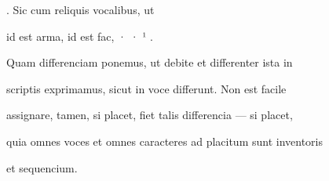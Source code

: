  . Sic cum reliquis vocalibus, ut   

 id est arma,  id est fac, · · ¹ . 

Quam differenciam ponemus, ut debite et differenter ista in 

scriptis exprimamus, sicut in voce differunt. Non est facile 

assignare, tamen, si placet, fiet talis differencia — si placet,




\fullpreviouslines

{
\color{blue}
quia omnes voces et omnes caracteres ad placitum sunt inventoris

et sequencium.

}


\endinput






Non est facile 

assignare, tamen, si placet, fiet talis differencia — si placet,

60:
eo \y rkp.: quantocius.


\catcode `\^^M=5

  \newtip{48}{Łoś niesłusznie uważa, że \textit{bika} w obu wypadkach
    napisano błędnie zamiast \textit{ƀyka}. Przykłady są bowiem podane
    w~pisowni dotychczasowej dla pokazania jej niewystarczalności do
    zróżnicowania wyrazów \textit{bika} i \textit{byka}.} 

\obeylines




\newcommand{\margin}[1]{\annotatetextBlue{\{#1\}}{zapisy na marginesie}}



\renewcommand{\over}[1]{\annotatetextBlue{\{#1\}}{zapisy nad rządkami}}

\newcommand{\add}[1]{\annotatetextOlive{<#1>}{litery i wyrazy dodane, (których w tekście brak)}}

\newcommand{\extra}[1]{\colorbox{magenta!10}{[#1]}}

\newcommand{\overstr}[1]{\annotatetextMagenta{⟦#1⟧}{przekreślenia}}



